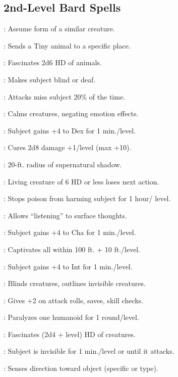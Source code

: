 \begin{multicols}{2}
\subsection{2nd-Level Bard Spells}
\begin{description*}
\item[\linkspell{Alter Self}:] Assume form of a similar creature.
\item[\linkspell{Animal Messenger}:] Sends a Tiny animal to a specific place.
\item[\linkspell{Animal Trance}:] Fascinates 2d6 HD of animals.
\item[\linkspell{Blindness/Deafness}:] Makes subject blind or deaf.
\item[\linkspell{Blur}:] Attacks miss subject 20\% of the time.
\item[\linkspell{Calm Emotions}:] Calms creatures, negating emotion effects.
\item[\linkspell{Cat’s Grace}:] Subject gains +4 to Dex for 1 min./level.
\item[\linkspell{Cure Moderate Wounds}:] Cures 2d8 damage +1/level (max +10).
\item[\linkspell{Darkness}:] 20-ft. radius of supernatural shadow.
\item[\linkspell{Daze Monster}:] Living creature of 6 HD or less loses next action.
\item[\linkspell{Delay Poison}:] Stops poison from harming subject for 1 hour/ level.
\item[\linkspell{Detect Thoughts}:] Allows “listening” to surface thoughts.
\item[\linkspell{Eagle’s Splendor}:] Subject gains +4 to Cha for 1 min./level.
\item[\linkspell{Enthrall}:] Captivates all within 100 ft. + 10 ft./level.
\item[\linkspell{Fox’s Cunning}:] Subject gains +4 to Int for 1 min./level.
\item[\linkspell{Glitterdust}:] Blinds creatures, outlines invisible creatures.
\item[\linkspell{Heroism}:] Gives +2 on attack rolls, saves, skill checks.
\item[\linkspell{Hold Person}:] Paralyzes one humanoid for 1 round/level.
\item[\linkspell{Hypnotic Pattern}:] Fascinates (2d4 + level) HD of creatures.
\item[\linkspell{Invisibility}:] Subject is invisible for 1 min./level or until it attacks.
\item[\linkspell{Locate Object}:] Senses direction toward object (specific or type).

\end{description*}
\end{multicols}
